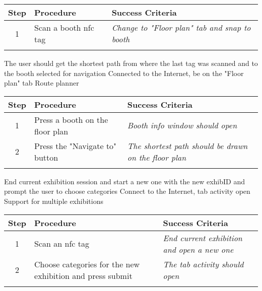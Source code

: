 \begin{center}
\begin{tabular}{| c | p{4.6cm} | p{4.6cm} |}
\hline
\textbf{Step} & \textbf{Procedure} & \textbf{Success Criteria}\\
\hline
1 & Scan a booth \ac{nfc} tag& \textit{Change to "Floor plan" tab and snap to booth}\\
\hline
\multicolumn{3}{c}{} \\%
\end{tabular}
\end{center}

\testcase
{\caseeight}
{The user should get the shortest path from where the last tag was scanned and to the booth selected for navigation}
{Connected to the Internet, be on the "Floor plan" tab}
{Route planner}

\begin{center}
\begin{tabular}{| c | p{4.6cm} | p{4.6cm} |}
\hline
\textbf{Step} & \textbf{Procedure} & \textbf{Success Criteria}\\
\hline
1 & Press a booth on the floor plan & \textit{Booth info window should open}\\
\hline
2 & Press the "Navigate to" button & \textit{The shortest path should be drawn on the floor plan}\\
\hline
\multicolumn{3}{c}{} \\%
\end{tabular}
\end{center}

\testcase
{\casenine}
{End current exhibition session and start a new one with the new exhibID and prompt the user to choose categories}
{Connect to the Internet, tab activity open}
{Support for multiple exhibitions}
\begin{center}
\begin{tabular}{| c | p{4.6cm} | p{4.6cm} |}
\hline
\textbf{Step} & \textbf{Procedure} & \textbf{Success Criteria}\\
\hline
1 & Scan an \ac{nfc} tag & \textit{End current exhibition and open a new one}\\
\hline
2 & Choose categories for the new exhibition and press submit & \textit{The tab activity should open}\\
\hline
\multicolumn{3}{c}{} \\%
\end{tabular}
\end{center}

